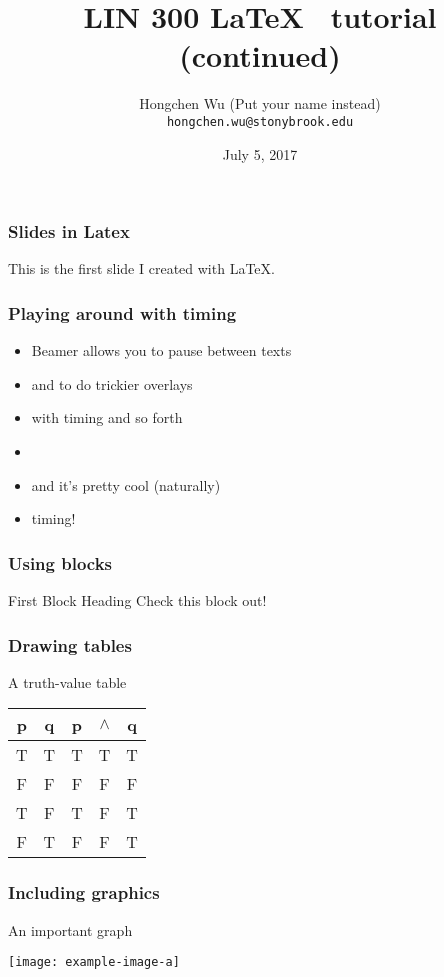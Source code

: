 \documentclass{beamer}
\begin{document}
     \begin{frame}
	      \title{LIN 300  \LaTeX~ tutorial (continued)}
		\author{Hongchen Wu (Put your name instead)\\
			                          \texttt{hongchen.wu@stonybrook.edu}}
		\date{July 5, 2017}
	      \maketitle
      \end{frame}

	\begin{frame}
	      \frametitle{Slides in Latex}
	     This is the first slide I created with \LaTeX. 
	\end{frame}

     \begin{frame}
           \frametitle{Playing around with timing}
		\begin{itemize}
		\item Beamer allows you to pause between texts
           \pause
		\item<2-> and to do trickier overlays
		\item<3-> with timing and so forth
		\item{}
		\item<5-> and it’s pretty cool (naturally)
		\item<3->timing!
		\end{itemize}
      \end{frame}

    \begin{frame}
         \frametitle{Using blocks}
         \begin{block}{First Block Heading}
              Check this block out!
         \end{block}
    \end{frame}

    \begin{frame}
         \frametitle{Drawing tables}
         \begin{block}{A truth-value table}
                \begin{center}
		              \begin{tabular}{cc|ccc}
		                   p & q & p & $\wedge $ & q \\
		                   \hline
		                   T & T & T & T & T \\
		                   F & F & F & F & F \\
		                   T & F & T & F & T \\
		                   F & T & F & F & T 
		               \end{tabular}
                \end{center}
         \end{block}
    \end{frame}

   
     \begin{frame}
         \frametitle{Including graphics}
         \begin{block}{An important graph}
                \begin{center}
                    \texttt{[image: example-image-a]}
                \end{center}
          \end{block}
     \end{frame}
\end{document}
